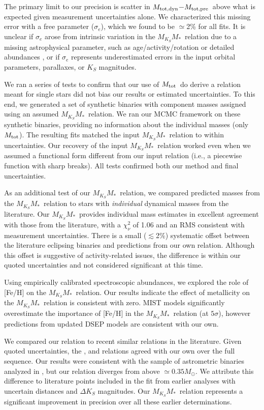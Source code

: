 \documentclass[twocolumn]{aastex62}
\newcommand{\mmk}{$M_{K_S}$\textendash$M_*$}
\newcommand{\mtot}{$M_{\rm{tot}}$}
\newcommand{\mpred}{$M_{\rm{tot,pre}}$}
\newcommand{\mdyn}{$M_{\rm{tot,dyn}}$}
\begin{document}
The primary limit to our precision is scatter in \mdyn$-$\mpred\ above what is expected given measurement uncertainties alone. We characterized this missing error with a free parameter ($\sigma_e$), which we found to be $\simeq$2\% for all fits. It is unclear if $\sigma_e$ arose from intrinsic variation in the \mmk\ relation due to a missing astrophysical parameter, such as age/activity/rotation \citep[e.g.,][]{Kraus2011,Feiden:2016aa,Somers2017} or detailed abundances \citep[e.g.,][]{2017A&A...604A..97L,Veyette2017}, or if $\sigma_e$ represents underestimated errors in the input orbital parameters, parallaxes, or $K_S$ magnitudes. 

We ran a series of tests to confirm that our use of \mtot\ do derive a relation meant for single stars did not bias our results or estimated uncertainties. To this end, we generated a set of synthetic binaries with component masses assigned using an assumed \mmk\ relation. We ran our MCMC framework on these synthetic binaries, providing no information about the individual masses (only \mtot). The resulting fits matched the input \mmk\ relation to within uncertainties. Our recovery of the input \mmk\ relation worked even when we assumed a functional form different from our input relation (i.e., a piecewise function with sharp breaks). All tests confirmed both our method and final uncertainties.

As an additional test of our \mmk\ relation, we compared predicted masses from the \mmk\ relation to stars with {\it individual} dynamical masses from the literature. Our \mmk\ provides individual mass estimates in excellent agreement with those from the literature, with a $\chi^2_\nu$ of 1.06 and an RMS consistent with measurement uncertainties. There is a small ($\lesssim$2\%) systematic offset between the literature eclipsing binaries and predictions from our own relation. Although this offset is suggestive of activity-related issues, the difference is within our quoted uncertainties and not considered significant at this time. 

Using empirically calibrated spectroscopic abundances, we explored the role of [Fe/H] on the \mmk\ relation. Our results indicate the effect of metallicity on the \mmk\ relation is consistent with zero. MIST models significantly overestimate the importance of [Fe/H] in the \mmk\ relation (at $5\sigma$), however predictions from updated DSEP models are consistent with our own. 

We compared our relation to recent similar relations in the literature. Given quoted uncertainties, the \citet{Hen1993}, \citet{Delfosse2000} and \citet{Mann2015b} relations agreed with our own over the full sequence. Our results were consistent with the sample of astrometric binaries analyzed in \citet{Benedict2016}, but our relation diverges from \citet{Benedict2016} above $\simeq0.35M_\odot$. We attribute this difference to literature points included in the \citet{Benedict2016} fit from earlier analyses with uncertain distances and $\Delta K_S$ magnitudes. Our \mmk\ relation represents a significant improvement in precision over all these earlier determinations. 
\end{document}
